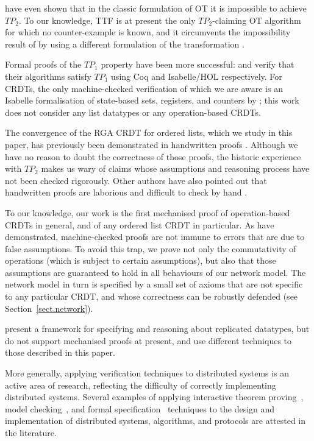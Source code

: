 \citet{Randolph:2015gj} have even shown that in the classic formulation of OT it is impossible to
achieve $\mathit{TP}_2$. To our knowledge, TTF is at present the only $\mathit{TP}_2$-claiming OT
algorithm for which no counter-example is known, and it circumvents the impossibility result of
\citet{Randolph:2015gj} by using a different formulation of the transformation
\cite{Oster:2006tr,Levien:2016wz}.

Formal proofs of the $\mathit{TP}_1$ property have been more successful: \citet{Sinchuk:2016cf} and \citet{Jungnickel:2015ua} verify that their algorithms satisfy $\mathit{TP}_1$ using Coq and Isabelle/HOL respectively.
For CRDTs, the only machine-checked verification of which we are aware is an Isabelle formalisation of state-based sets, registers, and counters by \citet{Zeller:2014fl}; this work does not consider any list datatypes or any operation-based CRDTs.

The convergence of the RGA CRDT for ordered lists, which we study in this paper, has previously been
demonstrated in handwritten proofs \cite{Attiya:2016kh,Kleppmann:2016ve,Roh:2009ws}. Although we
have no reason to doubt the correctness of those proofs, the historic experience with
$\mathit{TP}_2$ makes us wary of claims whose assumptions and reasoning process have not been
checked rigorously. Other authors have also pointed out that handwritten proofs are laborious and
difficult to check by hand \cite{Li:2008hw,Li:2005jq}.

To our knowledge, our work is the first mechanised proof of operation-based CRDTs in general, and of
any ordered list CRDT in particular. As \citet{Oster:2005vi} have demonstrated, machine-checked
proofs are not immune to errors that are due to false assumptions. To avoid this trap, we prove not
only the commutativity of operations (which is subject to certain assumptions), but also that those
assumptions are guaranteed to hold in all behaviours of our network model. The network model in turn
is specified by a small set of axioms that are not specific to any particular CRDT, and whose
correctness can be robustly defended (see Section~\ref{sect.network}).

\citet{Burckhardt:2014ft} present a framework for specifying and reasoning about replicated datatypes, but do not support mechanised proofs at present, and use different techniques to those described in this paper.

More generally, applying verification techniques to distributed systems is an active area of research, reflecting the difficulty of correctly implementing distributed systems.
Several examples of applying interactive theorem proving~\cite{DBLP:conf/pldi/WilcoxWPTWEA15,DBLP:journals/afp/DebratM12,DBLP:conf/sss/Charron-BostDM11}, model checking~\cite{DBLP:conf/asm/AzmyMW16,DBLP:journals/entcs/JohnsonLLV04}, and formal specification~\cite{DBLP:journals/ijaacs/TounsiMM16,DBLP:conf/asm/AndriamiarinaMS14,DBLP:conf/wetice/TounsiMM13} techniques to the design and implementation of distributed systems, algorithms, and protocols are attested in the literature.
